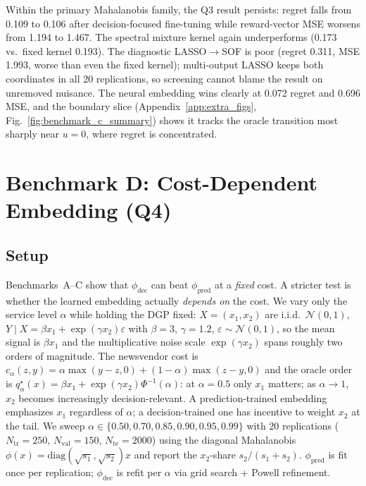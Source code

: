 \documentclass[11pt]{article}
\begin{document}
Within the primary Mahalanobis family, the Q3 result persists: regret falls from 0.109 to 0.106 after decision-focused fine-tuning while reward-vector MSE worsens from 1.194 to 1.467. The spectral mixture kernel again underperforms (0.173 vs.\ fixed kernel 0.193). The diagnostic LASSO$\to$SOF is poor (regret 0.311, MSE 1.993, worse than even the fixed kernel); multi-output LASSO keeps both coordinates in all 20 replications, so screening cannot blame the result on unremoved nuisance. The neural embedding wins clearly at 0.072 regret and 0.696 MSE, and the boundary slice (Appendix~\ref{app:extra_figs}, Fig.~\ref{fig:benchmark_c_summary}) shows it tracks the oracle transition most sharply near $u=0$, where regret is concentrated.

\section{Benchmark D: Cost-Dependent Embedding (Q4)}\label{sec:benchD}

\subsection*{Setup}
Benchmarks~A--C show that $\phi_{\mathrm{dec}}$ can beat $\phi_{\mathrm{pred}}$ at a \emph{fixed} cost. A stricter test is whether the learned embedding actually \emph{depends on} the cost. We vary only the service level $\alpha$ while holding the DGP fixed: $X=(x_1,x_2)$ are i.i.d.\ $\mathcal N(0,1)$, $Y\mid X=\beta x_1+\exp(\gamma x_2)\varepsilon$ with $\beta=3$, $\gamma=1.2$, $\varepsilon\sim\mathcal N(0,1)$, so the mean signal is $\beta x_1$ and the multiplicative noise scale $\exp(\gamma x_2)$ spans roughly two orders of magnitude. The newsvendor cost is $c_\alpha(z,y)=\alpha\max(y-z,0)+(1-\alpha)\max(z-y,0)$ and the oracle order is $q^\star_\alpha(x)=\beta x_1+\exp(\gamma x_2)\Phi^{-1}(\alpha)$: at $\alpha=0.5$ only $x_1$ matters; as $\alpha\to 1$, $x_2$ becomes increasingly decision-relevant. A prediction-trained embedding emphasizes $x_1$ regardless of $\alpha$; a decision-trained one has incentive to weight $x_2$ at the tail. We sweep $\alpha\in\{0.50,0.70,0.85,0.90,0.95,0.99\}$ with 20 replications ($N_{\mathrm{tr}}=250$, $N_{\mathrm{val}}=150$, $N_{\mathrm{te}}=2000$) using the diagonal Mahalanobis $\phi(x)=\mathrm{diag}(\sqrt{s_1},\sqrt{s_2})x$ and report the $x_2$-share $s_2/(s_1+s_2)$. $\phi_{\mathrm{pred}}$ is fit once per replication; $\phi_{\mathrm{dec}}$ is refit per $\alpha$ via grid search + Powell refinement.
\end{document}
